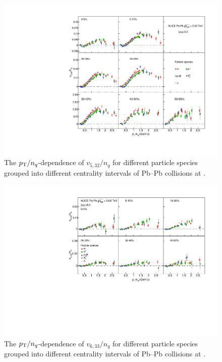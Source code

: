 \begin{figure}[!htb]
\begin{center}
\includegraphics[scale=0.82]{figures/scaling/All_v523_gap00_NCQ_3by3.pdf}

\end{center}
\caption{The $p_{\rm{T}}/n_{q}$-dependence of $v_{5,32}/n_{q}$ for different particle species grouped into different centrality intervals of Pb--Pb collisions at \sNN.}
\label{v523_NCQ}
\end{figure}

\begin{figure}[!htb]
\begin{center}
\includegraphics[scale=0.82]{figures/scaling/All_v633_gap00_NCQ_3by2.pdf}
\end{center}
\caption{The $p_{\rm{T}}/n_{q}$-dependence of $v_{6,33}/n_{q}$ for different particle species grouped into different centrality intervals of Pb--Pb collisions at \sNN.}
\label{v633_NCQ}
\end{figure}

